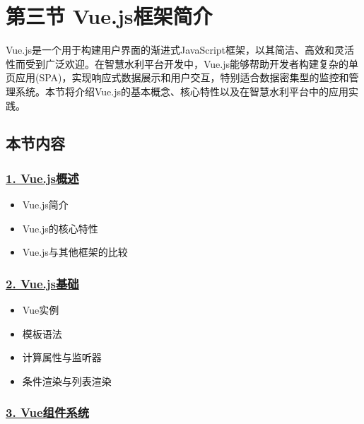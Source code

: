 \section{第三节
Vue.js框架简介}\label{ux7b2cux4e09ux8282-vue.jsux6846ux67b6ux7b80ux4ecb}

Vue.js是一个用于构建用户界面的渐进式JavaScript框架，以其简洁、高效和灵活性而受到广泛欢迎。在智慧水利平台开发中，Vue.js能够帮助开发者构建复杂的单页应用(SPA)，实现响应式数据展示和用户交互，特别适合数据密集型的监控和管理系统。本节将介绍Vue.js的基本概念、核心特性以及在智慧水利平台中的应用实践。

\subsection{本节内容}\label{ux672cux8282ux5185ux5bb9}

\subsubsection{\texorpdfstring{\href{./section04-03-01.md}{1.
Vue.js概述}}{1. Vue.js概述}}\label{vue.jsux6982ux8ff0}

\begin{itemize}
\tightlist
\item
  Vue.js简介
\item
  Vue.js的核心特性
\item
  Vue.js与其他框架的比较
\end{itemize}

\subsubsection{\texorpdfstring{\href{./section04-03-02.md}{2.
Vue.js基础}}{2. Vue.js基础}}\label{vue.jsux57faux7840}

\begin{itemize}
\tightlist
\item
  Vue实例
\item
  模板语法
\item
  计算属性与监听器
\item
  条件渲染与列表渲染
\end{itemize}

\subsubsection{\texorpdfstring{\href{./section04-03-03.md}{3.
Vue组件系统}}{3. Vue组件系统}}\label{vueux7ec4ux4ef6ux7cfbux7edf}

